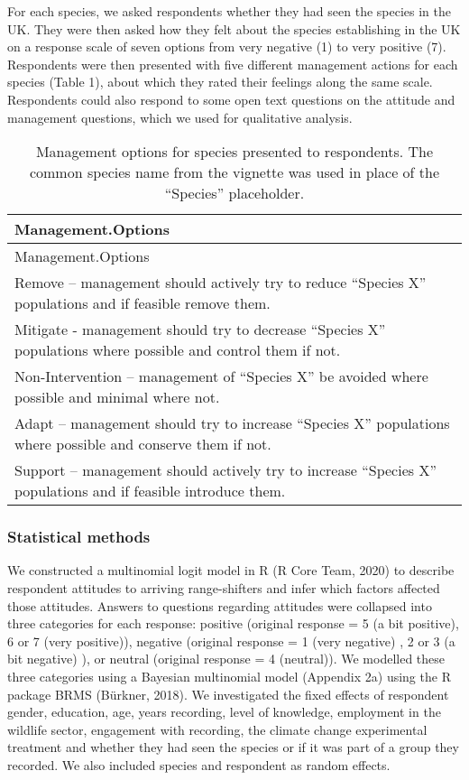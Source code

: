 \documentclass[
]{article}
\begin{document}
For each species, we asked respondents whether they had seen the species
in the UK. They were then asked how they felt about the species
establishing in the UK on a response scale of seven options from very
negative (1) to very positive (7). Respondents were then presented with
five different management actions for each species (Table 1), about
which they rated their feelings along the same scale. Respondents could
also respond to some open text questions on the attitude and management
questions, which we used for qualitative analysis.

\begin{longtable}[]{@{}
  >{\raggedright\arraybackslash}p{}@{}}
\caption{Management options for species presented to respondents. The
common species name from the vignette was used in place of the
``Species'' placeholder.}\tabularnewline
\toprule
Management.Options \\
\midrule
\endfirsthead
\toprule
Management.Options \\
\midrule
\endhead
Remove -- management should actively try to reduce ``Species X''
populations and if feasible remove them. \\
Mitigate - management should try to decrease ``Species X'' populations
where possible and control them if not. \\
Non-Intervention -- management of ``Species X'' be avoided where
possible and minimal where not. \\
Adapt -- management should try to increase ``Species X'' populations
where possible and conserve them if not. \\
Support -- management should actively try to increase ``Species X''
populations and if feasible introduce them. \\
\bottomrule
\end{longtable}

\hypertarget{statistical-methods}{%
\subsubsection{Statistical methods}\label{statistical-methods}}

We constructed a multinomial logit model in R (R Core Team, 2020) to
describe respondent attitudes to arriving range-shifters and infer which
factors affected those attitudes. Answers to questions regarding
attitudes were collapsed into three categories for each response:
positive (original response = 5 (a bit positive), 6 or 7 (very
positive)), negative (original response = 1 (very negative) , 2 or 3 (a
bit negative) ), or neutral (original response = 4 (neutral)). We
modelled these three categories using a Bayesian multinomial model
(Appendix 2a) using the R package BRMS (Bürkner, 2018). We investigated
the fixed effects of respondent gender, education, age, years recording,
level of knowledge, employment in the wildlife sector, engagement with
recording, the climate change experimental treatment and whether they
had seen the species or if it was part of a group they recorded. We also
included species and respondent as random effects.
\end{document}
